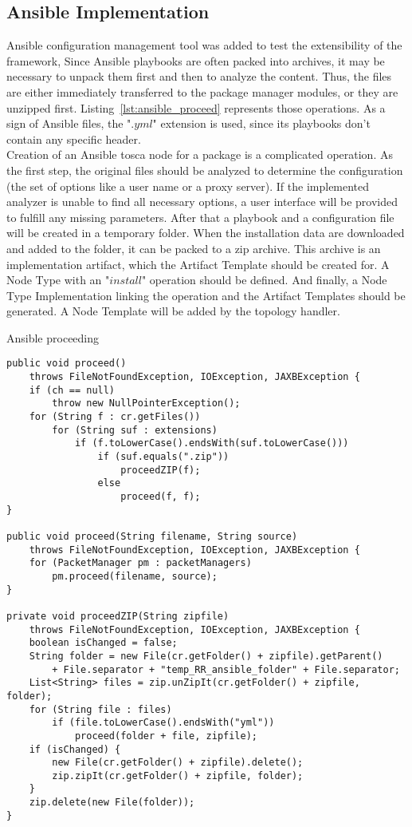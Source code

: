 \subsection*{Ansible Implementation}
Ansible configuration management tool was added to test the extensibility of the framework,
Since Ansible playbooks are often packed into archives, it may be necessary to unpack them first and then to analyze the content.
Thus, the files are either immediately transferred to the package manager modules, or they are unzipped first.
Listing~\ref{lst:ansible_proceed} represents those operations.
As a sign of Ansible files, the ".$yml$" extension is used, since its playbooks don't contain any specific header.\\
Creation of an Ansible \gls{tosca} node for a package is a complicated operation. 
As the first step, the original files should be analyzed to determine the configuration (the set of options like a user name or a proxy server).
If the implemented analyzer is unable to find all necessary options, a user interface will be provided to fulfill any missing parameters.
After that a playbook and a configuration file will be created in a temporary folder.
When the installation data are downloaded and added to the folder, it can be packed to a zip archive.
This archive is an implementation artifact, which the Artifact Template should be created for.
A Node Type with an "$install$" operation %
should be defined.
And finally, a Node Type Implementation linking the operation and the Artifact Templates should be generated.
A Node Template will be added by the topology handler.
\begin{Listing}
	\caption{Ansible proceeding}
	\label{lst:ansible_proceed}
\begin{lstlisting}
public void proceed()
	throws FileNotFoundException, IOException, JAXBException {
	if (ch == null)
		throw new NullPointerException();
	for (String f : cr.getFiles())
		for (String suf : extensions)
			if (f.toLowerCase().endsWith(suf.toLowerCase()))
				if (suf.equals(".zip")) 
					proceedZIP(f);
				else
					proceed(f, f);
}
	
public void proceed(String filename, String source)
	throws FileNotFoundException, IOException, JAXBException {
	for (PacketManager pm : packetManagers)
		pm.proceed(filename, source);
} 
	
private void proceedZIP(String zipfile)
	throws FileNotFoundException, IOException, JAXBException {
	boolean isChanged = false;
	String folder = new File(cr.getFolder() + zipfile).getParent()
		+ File.separator + "temp_RR_ansible_folder" + File.separator;
	List<String> files = zip.unZipIt(cr.getFolder() + zipfile, folder);
	for (String file : files)
		if (file.toLowerCase().endsWith("yml"))
			proceed(folder + file, zipfile);
	if (isChanged) {
		new File(cr.getFolder() + zipfile).delete();
		zip.zipIt(cr.getFolder() + zipfile, folder);
	}
	zip.delete(new File(folder));
}
\end{lstlisting}
\end{Listing}
